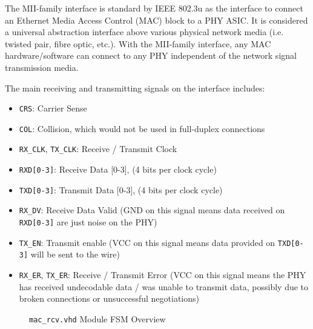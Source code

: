 \documentclass[a4paper]{report}
\newcommand{\code}{\texttt}
\begin{document}
The MII-family interface is standard by IEEE 802.3u \cite{ieee802.3ethernet-2018} as the interface to connect an Ethernet Media Access Control (MAC) block to a PHY ASIC. It is considered a universal abstraction interface above various physical network media (i.e. twisted pair, fibre optic, etc.). With the MII-family interface, any MAC hardware/software can connect to any PHY independent of the network signal transmission media.

The main receiving and transmitting signals on the interface includes:
\begin{itemize}
    \item \code{CRS}: Carrier Sense
    \item \code{COL}: Collision, which would not be used in full-duplex connections
    \item \code{RX\_CLK}, \code{TX\_CLK}: Receive / Transmit Clock
    \item \code{RXD[0-3]}: Receive Data [0-3],  (4 bits per clock cycle)
    \item \code{TXD[0-3]}: Transmit Data [0-3],  (4 bits per clock cycle)
    \item \code{RX\_DV}: Receive Data Valid (GND on this signal means data received on \code{RXD[0-3]} are just noise on the PHY)
    \item \code{TX\_EN}: Transmit enable (VCC on this signal means data provided on \code{TXD[0-3]} will be sent to the wire)
    \item \code{RX\_ER}, \code{TX\_ER}: Receive / Transmit Error (VCC on this signal means the PHY has received undecodable data / was unable to transmit data, possibly due to broken connections or unsuccessful negotiations)
\end{itemize}

\begin{figure}[h!]
  \caption{\code{mac\_rcv.vhd} Module FSM Overview}
  \label{fig:rcv-fsm}
\end{figure}
\end{document}

